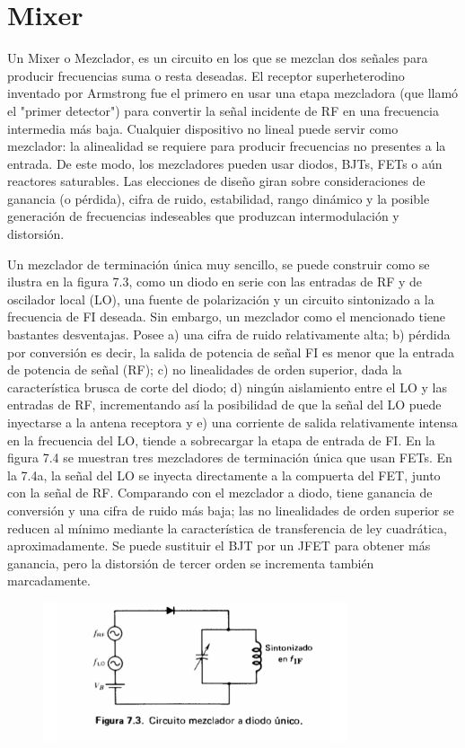 \documentclass[a4paper,12pt,twoside]{article}
\begin{document}
\section{Mixer}
Un Mixer o Mezclador, es un circuito en los que se mezclan dos señales para producir frecuencias suma o resta deseadas. El receptor superheterodino inventado por Armstrong fue el primero en usar una etapa mezcladora (que llamó el "primer detector") para convertir la señal incidente de RF en una frecuencia intermedia más baja.
Cualquier dispositivo no lineal puede servir como mezclador: la alinealidad se requiere para producir frecuencias
no presentes a la entrada. De este modo, los mezcladores pueden usar diodos, BJTs, FETs o aún reactores saturables.
Las elecciones de diseño giran sobre consideraciones de ganancia (o pérdida), cifra de ruido, estabilidad, 
rango dinámico y la posible generación de frecuencias indeseables que produzcan intermodulación y distorsión.

Un mezclador de terminación única muy sencillo, se puede construir como se ilustra en la figura 7.3, como un
diodo en serie con las entradas de RF y de oscilador local (LO), una fuente de polarización y un circuito sintonizado
 a la frecuencia de FI deseada.
Sin embargo, un mezclador como el mencionado tiene bastantes desventajas. Posee a) una cifra de ruido relativamente alta;
 b) pérdida por conversión es decir, la salida de potencia de señal FI es menor que la entrada de potencia de señal (RF);
 c) no linealidades de orden superior, dada la característica brusca de corte del diodo; d) ningún
aislamiento entre el LO y las entradas de RF, incrementando así la posibilidad de que la señal del LO puede inyectarse
 a la antena receptora y e) una corriente de salida relativamente intensa en la frecuencia del LO, tiende a sobrecargar la etapa de entrada de FI.
En la figura 7.4 se muestran tres mezcladores de terminación única que usan FETs. En la 7.4a, la señal del LO
se inyecta directamente a la compuerta del FET, junto con la señal de RF. Comparando con el mezclador a diodo,
tiene ganancia de conversión y una cifra de ruido más baja; las no linealidades de orden superior se reducen al mínimo 
mediante la característica de transferencia de ley cuadrática, aproximadamente. Se puede sustituir el BJT por
un JFET para obtener más ganancia, pero la distorsión de tercer orden se incrementa también marcadamente.

\begin{figure}[H]
    \centering
    \includegraphics[width=0.8\textwidth]{../img/mezclador2.png}
\end{figure}
\end{document}
